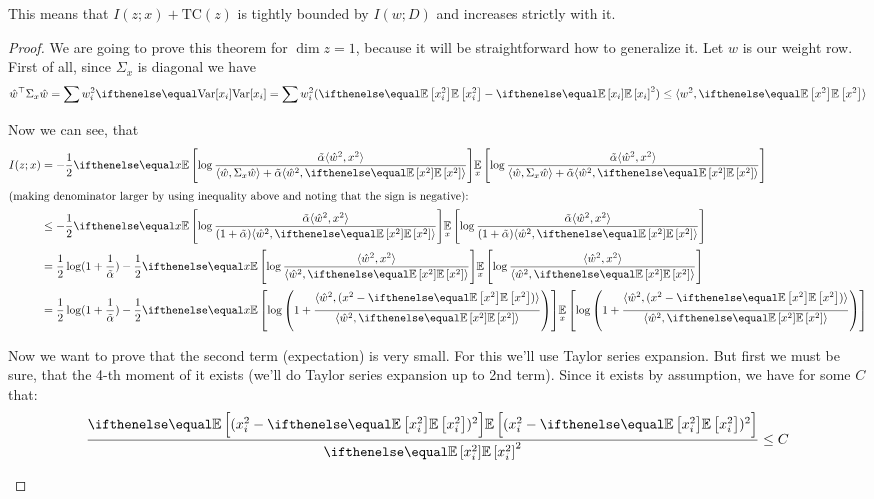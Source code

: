 \documentclass{article}
\begin{document}
This means that $I(z;x) + \text{TC}(z)$ is tightly bounded by $I(w;D)$ and increases strictly with it.

\begin{proof}
We are going to prove this theorem for $\dim z = 1$, because it will be straightforward how to generalize it.
Let $w$ is our weight row.
First of all, since $\Sigma_x$ is diagonal we have
\[
\hat{w}^\top \Sigma_x \hat{w} = \sum w_i^2 \var{x_i} = \sum w_i^2 (\expect{x_i^2} - \expect{x_i}^2) \leq \langle w^2, \expect{x^2} \rangle
\]

Now we can see, that
\begin{align*}
I(z;x)
&= -\frac{1}{2}\expect[x]{\log \frac{\tilde \alpha \langle \hat w^2, x^2 \rangle }{\langle \hat w, \Sigma_x \hat w \rangle + \tilde \alpha \langle \hat w^2, \expect{x^2} \rangle}}
\\
\shortintertext{(making denominator larger by using inequality above and noting that the sign is negative):}
&\leq -\frac{1}{2}\expect[x]{\log \frac{\tilde \alpha \langle \hat w^2, x^2 \rangle }{(1 + \tilde \alpha) \langle \hat w^2, \expect{x^2} \rangle}}
\\
&= \frac{1}{2}\log(1 + \frac{1}{\tilde\alpha}) - \frac{1}{2}\expect[x]{\log \frac{\langle \hat w^2, x^2 \rangle }{\langle \hat w^2, \expect{x^2} \rangle}}
\\
&= \frac{1}{2}\log(1 + \frac{1}{\tilde\alpha}) - \frac{1}{2}\expect[x]{\log \left(1 + \frac{\langle \hat w^2, (x^2 - \expect{x^2}) \rangle }{\langle \hat w^2, \expect{x^2} \rangle}\right)}
\end{align*}

Now we want to prove that the second term (expectation) is very small.
For this we'll use Taylor series expansion.
But first we must be sure, that the 4-th moment of it exists (we'll do Taylor series expansion up to 2nd term).
Since it exists by assumption, we have for some $C$ that:
\[
\frac{\expect{(x_i^2 - \expect{x_i^2})^2}}{\expect{x_i^2}^2} \leq C
\]


\end{proof}
\end{document}
